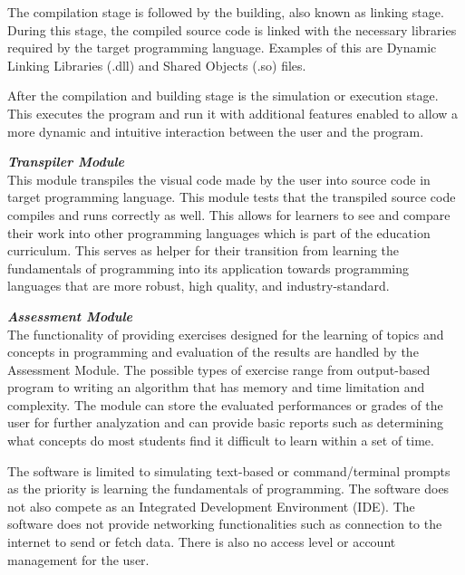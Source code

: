 \parx
The compilation stage is followed by the building, also known as linking stage.
During this stage, the compiled source code is linked with the necessary libraries
required by the target programming language. Examples of this are Dynamic Linking
Libraries (.dll) and Shared Objects (.so) files.

\parx
After the compilation and building stage is the simulation or execution stage.  This
executes the program and run it with additional features enabled to allow a more
dynamic and intuitive interaction between the user and the program.

\flushleft
\textbf{\textit{Transpiler Module}}\\
\justifying
\parx
This module transpiles the visual code made by the user into source code in target
programming language. This module tests that the transpiled source code compiles
and runs correctly as well. This allows for learners to see and compare their
work into other programming languages which is part of the education curriculum.
This serves as helper for their transition from learning the fundamentals of
programming into its application towards programming languages that are more
robust, high quality, and industry-standard.

\flushleft
\textbf{\textit{Assessment Module}}\\
\justifying
\parx
The functionality of providing exercises designed for the learning of topics and
concepts in programming and evaluation of the results are handled by the Assessment
Module. The possible types of exercise range from output-based program to writing
an algorithm that has memory and time limitation and complexity. The module can
store the evaluated performances or grades of the user for further analyzation
and can provide basic reports such as determining what concepts do most students
find it difficult to learn within a set of time.

\parx
The software is limited to simulating text-based or command/terminal prompts as the
priority is learning the fundamentals of programming. The software does not also
compete as an Integrated Development Environment (IDE). The software does not provide
networking functionalities such as connection to the internet to send or fetch data.
There is also no access level or account management for the user.\\
